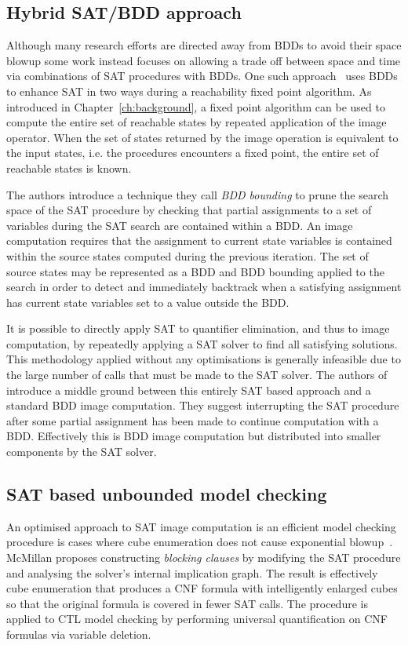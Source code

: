 \subsection{Hybrid SAT/BDD approach}

Although many research efforts are directed away from BDDs to avoid their space blowup some work instead focuses on allowing a trade off between space and time via combinations of SAT procedures with BDDs. One such approach~\cite{Gupta00} uses BDDs to enhance SAT in two ways during a reachability fixed point algorithm.  As introduced in Chapter~\ref{ch:background}, a fixed point algorithm can be used to compute the entire set of reachable states by repeated application of the image operator.  When the set of states returned by the image operation is equivalent to the input states, i.e. the procedures encounters a fixed point, the entire set of reachable states is known.

The authors introduce a technique they call \emph{BDD bounding} to prune the search space of the SAT procedure by checking that partial assignments to a set of variables during the SAT search are contained within a BDD. An image computation requires that the assignment to current state variables is contained within the source states computed during the previous iteration. The set of source states may be represented as a BDD and BDD bounding applied to the search in order to detect and immediately backtrack when a satisfying assignment has current state variables set to a value outside the BDD.

It is possible to directly apply SAT to quantifier elimination, and thus to image computation, by repeatedly applying a SAT solver to find all satisfying solutions. This methodology applied without any optimisations is generally infeasible due to the large number of calls that must be made to the SAT solver. The authors of \cite{Gupta00} introduce a middle ground between this entirely SAT based approach and a standard BDD image computation. They suggest interrupting the SAT procedure after some partial assignment has been made to continue computation with a BDD. Effectively this is BDD image computation but distributed into smaller components by the SAT solver.

\subsection{SAT based unbounded model checking}

An optimised approach to SAT image computation is an efficient model checking procedure is cases where cube enumeration does not cause exponential blowup~\cite{McMillan02}. McMillan proposes constructing \emph{blocking clauses} by modifying the SAT procedure and analysing the solver's internal implication graph. The result is effectively cube enumeration that produces a CNF formula with intelligently enlarged cubes so that the original formula is covered in fewer SAT calls. The procedure is applied to CTL model checking by performing universal quantification on CNF formulas via variable deletion.

